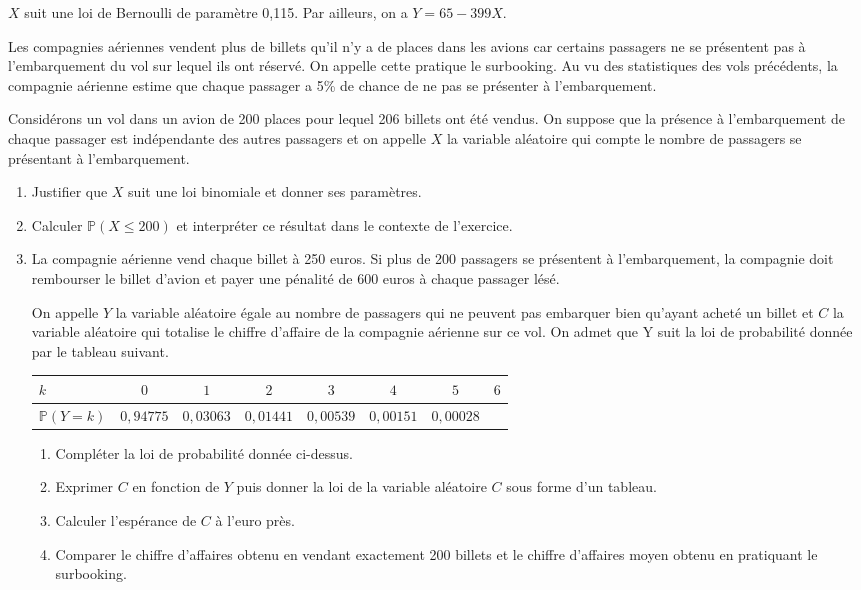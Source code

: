 \documentclass[11pt,fleqn, openany]{book} %
\begin{document}
\begin{solution}$X$ suit une loi de Bernoulli de paramètre 0,115. Par ailleurs, on a $Y=65-399X$.\end{solution}



\begin{exercise}[topic=lgn01, subtitle={(Asie 2022)}]Les compagnies aériennes vendent plus de billets qu'il n'y a de places dans les avions car certains passagers ne se présentent pas à l'embarquement du vol sur lequel ils ont réservé. On appelle cette pratique le surbooking. Au vu des statistiques des vols précédents, la compagnie aérienne estime que chaque passager a 5\% de chance de ne pas se présenter à l'embarquement.

Considérons un vol dans un avion de 200 places pour lequel 206 billets ont été vendus. On suppose que la présence à l'embarquement de chaque passager est indépendante des autres passagers et on appelle $X$ la variable aléatoire qui compte le nombre de passagers se présentant à l'embarquement.

\begin{enumerate}
\item Justifier que $X$ suit une loi binomiale et donner ses paramètres.
\item Calculer $\mathbb{P}(X \leqslant 200)$ et interpréter ce résultat dans le contexte de l'exercice.
\item La compagnie aérienne vend chaque billet à 250 euros. Si plus de 200 passagers se présentent à l'embarquement, la compagnie doit rembourser le billet d'avion et payer une pénalité de 600 euros à chaque passager lésé.

On appelle $Y$ la variable aléatoire égale au nombre de passagers qui ne peuvent pas embarquer bien qu'ayant acheté un billet et $C$ la variable aléatoire qui totalise le chiffre d'affaire de la compagnie aérienne sur ce vol. On admet que Y suit la loi de probabilité donnée par le tableau suivant.

\begin{center}
\begin{tabular}{|l|c|c|c|c|c|c|c|}
\hline
$k$ & $0$& $1$ & $2$ & $3$ & $4$ & $5$ & $6$ \\
\hline
$\mathbb{P}(Y=k)$ & $0,94775$ & $0,03063$ & $0,01441$   & $0,00539$ & $0,00151$ & $0,00028$ & \\
\hline \end{tabular}
\end{center}

\begin{enumerate}
\item Compléter la loi de probabilité donnée ci-dessus.
\item Exprimer $C$ en fonction de $Y$ puis donner la loi de la variable aléatoire $C$ sous forme d'un tableau.
\item Calculer l'espérance de $C$ à l'euro près.
\item Comparer le chiffre d'affaires obtenu en vendant exactement 200 billets et le chiffre d'affaires moyen obtenu en pratiquant le surbooking.
\end{enumerate}
\end{enumerate}\end{exercise}
\end{document}
